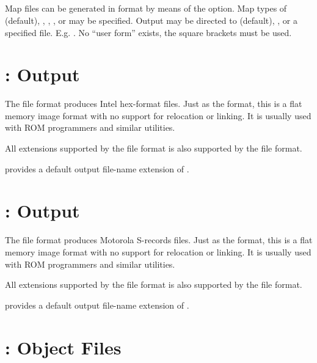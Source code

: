 \subsection{}
\label{subsec:map}

Map files can be generated in  format by means of the \code{[map]}
option. Map types of  (default), , ,
, or  may be specified. Output may be directed
to  (default), , or a specified file. E.g.
. No ``user form'' exists, the square
brackets must be used.

\section{:  Output}
\label{sec:ithfmt}

The  file format produces Intel hex-format files. Just as the
 format, this is a flat memory image format with no support for
relocation or linking. It is usually used with ROM programmers and
similar utilities.

All extensions supported by the  file format is also supported by
the  file format.

 provides a default output file-name extension of .

\section{:  Output}
\label{sec:srecfmt}

The  file format produces Motorola S-records files. Just as the
 format, this is a flat memory image format with no support for
relocation or linking. It is usually used with ROM programmers and similar
utilities.

All extensions supported by the  file format is also supported by
the  file format.

 provides a default output file-name extension of .

\section{:  Object Files}
\label{sec:objfmt}

